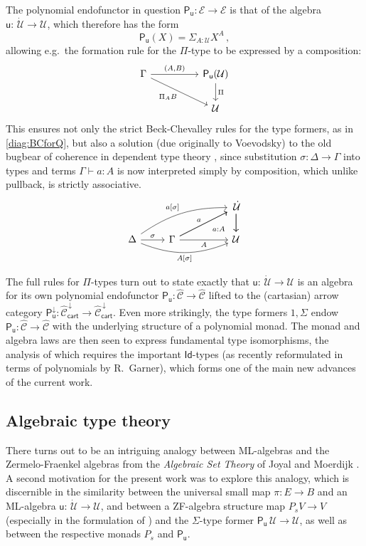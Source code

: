 \documentclass[12pt,reqno]{amsart}
\newcommand{\CC}{\ensuremath{\mathcal{C}}}
\newcommand{\EE}{\ensuremath{\mathcal{E}}}
\newcommand{\alg}[1]{\ensuremath{\mathsf{#1}}}
\renewcommand{\to}{\ensuremath{\rightarrow}}
\newcommand{\too}{\ensuremath{\longrightarrow}}
\newcommand{\Id}{\mathsf{Id}}
\newcommand{\U}{\ensuremath{\mathcal{U}}}
\newcommand{\UU}{\ensuremath{\,\dot{\mathcal{U}}}}
\renewcommand{\u}{\ensuremath{\mathsf{u}}}
\renewcommand{\t}{\ensuremath{\mathsf{u}}}
\theoremstyle{remark}
\theoremstyle{definition}
\begin{document}
The polynomial endofunctor in question $\alg{P}_\t : \EE \to \EE$  is that of the algebra $\u:\UU \to \U$, which therefore has the form
\[
\alg{P}_{\u}(X) = \Sigma_{A: \U} X^A\,,
\]
allowing e.g.\ the formation rule for the $\Pi$-type to be expressed by a composition:
\begin{equation*}
\begin{tikzcd}
 \Gamma \ar[rr, "{(A,B)}" ] \ar[rrd,swap,  "{\Pi_A B}"] &&\alg{P}_\u (\U) \ar[d, "{\Pi}"] \\
 && \U
\end{tikzcd}
\end{equation*} 
This ensures not only the strict Beck-Chevalley rules for the type formers, as in \eqref{diag:BCforQ}, but also a solution (due originally to Voevodsky) to the old bugbear of coherence in dependent type theory \cite{Hofmann:1994}, since substitution $\sigma : \Delta \to \Gamma$ into types and terms $\Gamma \vdash a:A$ is now interpreted simply by composition, which unlike pullback, is strictly associative.
\[
\begin{tikzcd}
 	&&&  {\UU} \ar[d]\ar[d]\\
\Delta \ar[r,  "{\sigma}"] \ar[rrru, bend left = 4ex, "{a[\sigma]}"]\ar[rrr, swap, bend right = 5ex, "{A[\sigma]}"] & \Gamma \ar[rru, "a"]   \ar[rru, swap, "{\ \ a:A}"]  \ar[rr ,swap,  "A"]  && {\U}
\end{tikzcd}
\]

The full rules for $\Pi$-types turn out to state exactly that $\u : \UU\to\U$ is an algebra for its own polynomial endofunctor $\alg{P}_{\u} : \widehat{\CC} \to \widehat{\CC}$ lifted to the (cartasian) arrow category $\alg{P}_{\u}^{\downarrow}: \widehat{\CC}^{\,\downarrow}_{\mathsf{cart}} \too \widehat{\CC}^{\,\downarrow}_{\mathsf{cart}}$.
Even more strikingly, the type formers $1, \Sigma$ endow $\alg{P}_{\u} : \widehat{\CC} \to \widehat{\CC}$ with the underlying structure of a polynomial monad.  The monad and algebra laws are then seen to express fundamental type isomorphisms, the analysis of which requires the important $\Id{}$-types (as recently reformulated in terms of polynomials by R.\ Garner), which forms one of the main new advances of the current work.

\subsection*{Algebraic type theory} There turns out to be an intriguing analogy between ML-algebras and the Zermelo-Fraenkel algebras from the \emph{Algebraic Set Theory} of Joyal and Moerdijk \cite{JM:AST}.  A second motivation for the present work was to explore this analogy, which is discernible in the similarity between the universal small map $\pi : E \to B$ and an ML-algebra $\u : \UU \to \U$, and between a ZF-algebra structure map $P_sV \to V$ (especially in the formulation of \cite{Simpson:1999}) and the $\Sigma$-type former $\alg{P}_{\!\u}\, \U \to \U$, as well as between the respective monads $P_s$ and $\alg{P}_{\!\u}$. 
\end{document}
